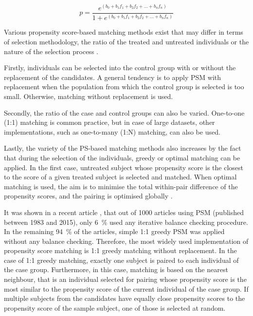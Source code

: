 \begin{equation}
	\label{eq:ps2}
	p=\frac{e^{(b_0+b_1f_1+b_2f_2+\dots+b_nf_n)}}{1+e^{(b_0+b_1f_1+b_2f_2+\dots+b_nf_n)}}
\end{equation}

Various propensity score-based matching methods exist that may differ in terms of selection methodology, the ratio of the treated and untreated individuals or the nature of the selection process \cite{dehejia2002propensity, rubin2006matched, lee2011weight, lee2013propensity, austin2014comparison}.

Firstly, individuals can be selected into the control group with or without the replacement of the candidates. A general tendency is to apply PSM with replacement when the population from which the control group is selected is too small. Otherwise, matching without replacement is used.

Secondly, the ratio of the case and control groups can also be varied. One-to-one (1:1) matching is common practice, but in case of large datasets, other implementations, such as one-to-many (1:N) matching, can also be used.

Lastly, the variety of the PS-based matching methods also increases by the fact that during the selection of the individuals, greedy or optimal matching can be applied. In the first case, untreated subject whose propensity score is the closest to the score of a given treated subject is selected and matched. When optimal matching is used, the aim is to minimise the total within-pair difference of the propensity scores, and the pairing is optimised globally \cite{rosenbaum2002overt, rosenbaum2010design}.

It was shown in a recent article \cite{king2019propensity}, that out of 1000 articles using PSM (published between 1983 and 2015), only \SI{6}{\percent} used any iterative balance checking procedure. In the remaining \SI{94}{\percent} of the articles, simple 1:1 greedy PSM was applied without any balance checking. Therefore, the most widely used implementation of propensity score matching is 1:1 greedy matching without replacement. In the case of 1:1 greedy matching, exactly one subject is paired to each individual of the case group. Furthermore, in this case, matching is based on the nearest neighbour, that is an individual selected for pairing whose propensity score is the most similar to the propensity score of the current individual of the case group. If multiple subjects from the candidates have equally close propensity scores to the propensity score of the sample subject, one of those is selected at random.

